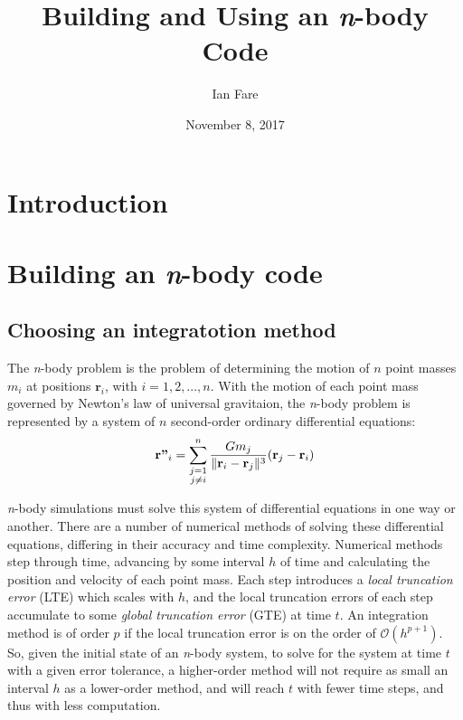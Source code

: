 \documentclass{article}
\title{Building and Using an \textit{n}-body Code}
\author{Ian Fare}
\date{November 8, 2017}
\DeclarePairedDelimiter{\norm}{\lVert}{\rVert}
\begin{document}
\maketitle

\section{Introduction}

\section{Building an \textit{n}-body code}

\subsection{Choosing an integratotion method}

The \textit{n}-body problem is the problem of determining the motion of $n$ point masses $m_i$ at positions $\textbf{r}_i$, with $i=1,2,...,n$. With the motion of each point mass governed by Newton's law of universal gravitaion, the \textit{n}-body problem is represented by a system of $n$ second-order ordinary differential equations:
\begin{equation}
    \textbf{r''}_i = \sum_{\substack{j=1\\j\neq i}}^n \frac{Gm_j}{\norm{\textbf{r}_i-\textbf{r}_j}^3}(\textbf{r}_j-\textbf{r}_i)
\end{equation}

\textit{n}-body simulations must solve this system of differential equations in one way or another. There are a number of numerical methods of solving these differential equations, differing in their accuracy and time complexity. Numerical methods step through time, advancing by some interval $h$ of time and calculating the position and velocity of each point mass. Each step introduces a \textit{local truncation error} (LTE) which scales with $h$, and the local truncation errors of each step accumulate to some \textit{global truncation error} (GTE) at time $t$. An integration method is of order $p$ if the local truncation error is on the order of $\mathcal{O}(h^{p+1})$. So, given the initial state of an \textit{n}-body system, to solve for the system at time $t$ with a given error tolerance, a higher-order method will not require as small an interval $h$ as a lower-order method, and will reach $t$ with fewer time steps, and thus with less computation. 
\end{document}
